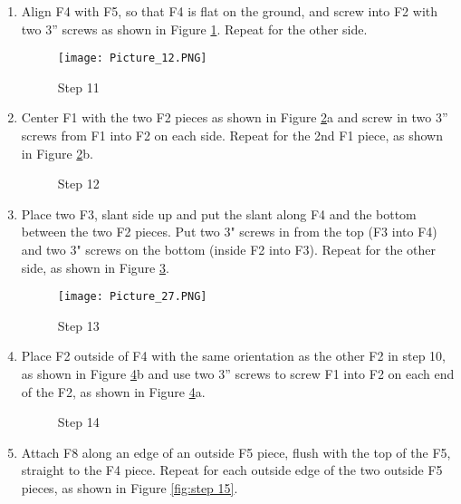 \documentclass[11pt,english]{article}
\begin{document}
\begin{enumerate}
\item Align F4 with F5, so that F4 is flat on the ground, and screw into F2 with two 3” screws as shown in Figure \ref{fig:step11}. Repeat for the other side.

\begin{figure}[ht!]
\centering
\texttt{[image: Picture\_12.PNG]}
\caption{Step 11}
\label{fig:step11}
\end{figure}

\item Center F1 with the two F2 pieces as shown in Figure \ref{fig:step 12}a and screw in two 3” screws from F1 into F2 on each side. Repeat for the 2nd F1 piece, as shown in Figure \ref{fig:step 12}b.

\begin{figure}[ht!]%
\centering
    \qquad
    \caption{Step 12}%
    \label{fig:step 12}%
\end{figure}
\newpage
\item Place two F3, slant side up and put the slant along F4 and the bottom between the two F2 pieces. Put two 3" screws in from the top (F3 into F4) and two 3" screws on the bottom (inside F2 into F3).  Repeat for the other side, as shown in Figure \ref{fig:step 13}. 

\begin{figure}[ht!]
\centering
\texttt{[image: Picture\_27.PNG]}
\caption{Step 13}
\label{fig:step 13}
\end{figure}


\item Place F2 outside of F4 with the same orientation as the other F2 in step 10, as shown in Figure \ref{fig:step 14}b and use two 3” screws to screw F1 into F2 on each end of the F2, as shown in Figure \ref{fig:step 14}a.


\begin{figure}[ht!]%
\centering
    \qquad
    \caption{Step 14}%
    \label{fig:step 14}%
\end{figure}

\newpage
\item Attach F8 along an edge of an outside F5 piece, flush with the top of the F5, straight to the F4 piece. Repeat for each outside edge of the two outside F5 pieces, as shown in Figure \ref{fig:step 15}.



\end{enumerate}
\end{document}

